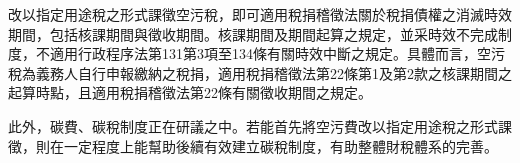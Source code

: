 \documentclass[11pt,a4paper]{article}
\begin{document}
改以指定用途稅之形式課徵空污稅，即可適用稅捐稽徵法關於稅捐債權之消滅時效期間，包括核課期間與徵收期間。核課期間及期間起算之規定，並采時效不完成制度，不適用行政程序法第131第3項至134條有關時效中斷之規定。具體而言，空污稅為義務人自行申報繳納之稅捐，適用稅捐稽徵法第22條第1及第2款之核課期間之起算時點，且適用稅捐稽徵法第22條有關徵收期間之規定。

此外，碳費、碳稅制度正在研議之中。若能首先將空污費改以指定用途稅之形式課徵，則在一定程度上能幫助後續有效建立碳稅制度，有助整體財稅體系的完善。

















\end{document}
